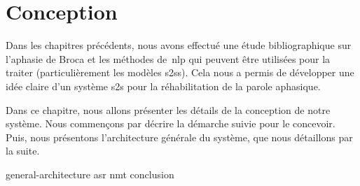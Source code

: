 \chapter{Conception}
\label{chap.conception}

Dans les chapitres précédents, nous avons effectué une étude bibliographique sur l'aphasie de Broca 
et les méthodes de~\gls{nlp} qui peuvent être utilisées pour la traiter 
(particulièrement les modèles \glspl{s2s}).
Cela nous a permis de développer une idée claire d'un système \gls{s2s} pour la réhabilitation de la parole aphasique.

Dans ce chapitre, nous allons présenter les détails de la conception de notre système.
Nous commençons par décrire la démarche suivie pour le concevoir.
Puis, nous présentons l'architecture générale du système, 
que nous détaillons par la suite.

{general-architecture}
{asr}
{nmt}
{conclusion}
